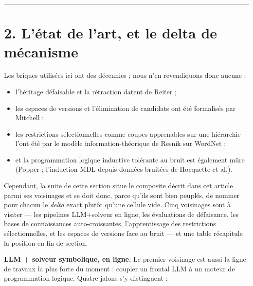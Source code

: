 \documentclass[11pt]{article}
\begin{document}
\medskip\hrule\medskip

\section*{2. L'état de l'art, et le delta de mécanisme}

Les briques utilisées ici ont des décennies ; nous n'en revendiquons donc aucune :

\begin{itemize}
\item l'héritage défaisable et la rétraction datent de Reiter ;
\item les espaces de versions et l'élimination de candidats ont été formalisés par Mitchell ;
\item les restrictions sélectionnelles comme coupes apprenables sur une hiérarchie l'ont été par le modèle information-théorique de Resnik sur WordNet ;
\item et la programmation logique inductive tolérante au bruit est également mûre (Popper ; l'induction MDL depuis données bruitées de Hocquette et al.).
\end{itemize}

Cependant, la suite de cette section situe le composite décrit dans cet article parmi ses voisinages et se doit donc, parce qu'ils sont bien peuplés, de nommer pour chacun le \emph{delta} exact plutôt qu'une cellule vide. Cinq voisinages sont à visiter — les pipelines LLM+solveur en ligne, les évaluations de défaisance, les bases de connaissances auto-croissantes, l'apprentissage des restrictions sélectionnelles, et les espaces de versions face au bruit — et une table récapitule la position en fin de section.

\textbf{LLM + solveur symbolique, en ligne.} Le premier voisinage est aussi la ligne de travaux la plus forte du moment : coupler un frontal LLM à un moteur de programmation logique. Quatre jalons s'y distinguent :
\end{document}
